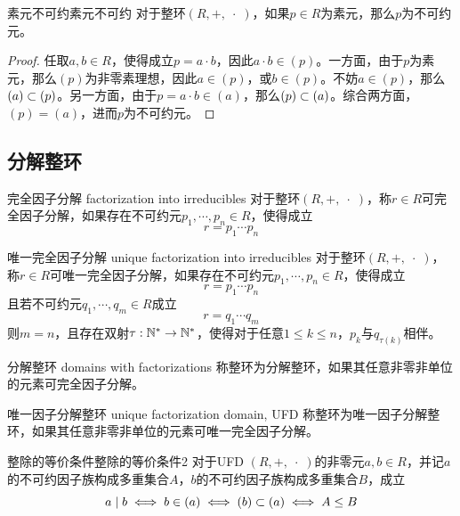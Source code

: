 \begin{lemma}{素元不可约}{素元不可约}
	对于整环$(R,+,\;\cdot\;)$，如果$p\in R$为素元，那么$p$为不可约元。
\end{lemma}

\begin{proof}
	任取$a,b\in R$，使得成立$p=a\cdot b$，因此$a\cdot b\in (p)$。一方面，由于$p$为素元，那么$(p)$为非零素理想，因此$a\in (p)$，或$b\in (p)$。不妨$a\in (p)$，那么$(a)\subset (p)$。另一方面，由于$p=a\cdot b\in (a)$，那么$(p)\subset (a)$。综合两方面，$(p)=(a)$，进而$p$为不可约元。
\end{proof}

\subsection{分解整环}

\begin{definition}{完全因子分解 factorization into irreducibles}
	对于整环$(R,+,\;\cdot\;)$，称$r\in R$可完全因子分解，如果存在不可约元$p_1,\cdots,p_n\in R$，使得成立
	$$
	r=p_1\cdots p_n
	$$
\end{definition}

\begin{definition}{唯一完全因子分解 unique factorization into irreducibles}
	对于整环$(R,+,\;\cdot\;)$，称$r\in R$可唯一完全因子分解，如果存在不可约元$p_1,\cdots,p_n\in R$，使得成立
	$$
	r=p_1\cdots p_n
	$$
	且若不可约元$q_1,\cdots,q_m\in R$成立
	$$
	r=q_1\cdots q_m
	$$
	则$m=n$，且存在双射$\tau:\mathbb{N}^*\to\mathbb{N}^*$，使得对于任意$1\le k\le n$，$p_k$与$q_{\tau(k)}$相伴。
\end{definition}

\begin{definition}{分解整环 domains with factorizations}
	称整环为分解整环，如果其任意非零非单位的元素可完全因子分解。
\end{definition}

\begin{definition}{唯一因子分解整环 unique factorization domain, UFD}
	称整环为唯一因子分解整环，如果其任意非零非单位的元素可唯一完全因子分解。
\end{definition}

\begin{lemma}{整除的等价条件}{整除的等价条件2}
	对于UFD $(R,+,\;\cdot\;)$的非零元$a,b\in R$，并记$a$的不可约因子族构成多重集合$A$，$b$的不可约因子族构成多重集合$B$，成立
	$$
	a\mid b
	\iff b\in (a)
	\iff (b)\subset (a)
	\iff A\le B
	$$
\end{lemma}

